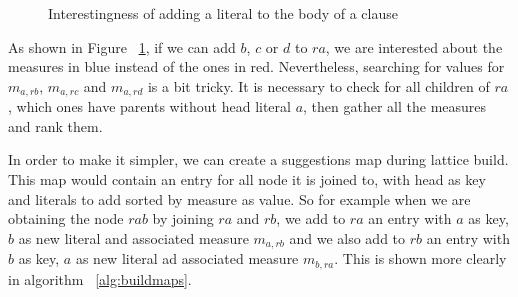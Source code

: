 \begin{figure}[!h]
  \caption{Interestingness of adding a literal to the body of a clause}
  \centering
  \label{fig:latticeSuggestion}
\end{figure}

As shown in Figure ~\ref{fig:latticeSuggestion}, if we can add $b$, $c$ or $d$ to $ra$, we are interested about the
measures in blue instead of the ones in red. Nevertheless, searching for values for $m_{a,rb}$, $m_{a,rc}$ and
$m_{a,rd}$ is a bit tricky. It is necessary to check for all children of $ra$, which ones have parents without head
literal $a$, then gather all the measures and rank them.

In order to make it simpler, we can create a suggestions map during lattice build. This map would contain an entry for
all node it is joined to, with head as key and literals to add sorted by measure as value. So for example when we are
obtaining the node $rab$ by joining $ra$ and $rb$, we add to $ra$ an entry with $a$ as key, $b$ as new literal and
associated measure $m_{a,rb}$ and we also add to $rb$ an entry with $b$ as key, $a$ as new literal ad associated
measure
$m_{b,ra}$. This is shown more clearly in algorithm ~\ref{alg:buildmaps}.

